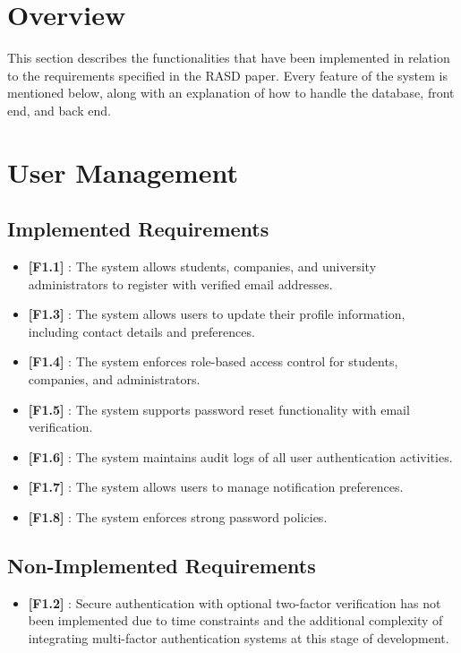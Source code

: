 \section{Overview}
\label{sec:overview}
This section describes the functionalities that have been implemented in relation to the requirements specified in the RASD paper. Every feature of the system is mentioned below, along with an explanation of how to handle the database, front end, and back end.

\section{User Management}
\subsection*{Implemented Requirements}
\begin{itemize}
    \item \textbf{[F1.1]} : The system allows students, companies, and university administrators to register with verified email addresses.
    \item \textbf{[F1.3]} : The system allows users to update their profile information, including contact details and preferences.
    \item \textbf{[F1.4]} : The system enforces role-based access control for students, companies, and administrators.
    \item \textbf{[F1.5]} : The system supports password reset functionality with email verification.
    \item \textbf{[F1.6]} : The system maintains audit logs of all user authentication activities.
    \item \textbf{[F1.7]} : The system allows users to manage notification preferences.
    \item \textbf{[F1.8]} : The system enforces strong password policies.
\end{itemize}

\subsection*{Non-Implemented Requirements}
\begin{itemize}
    \item \textbf{[F1.2]} : Secure authentication with optional two-factor verification has not been implemented due to time constraints and the additional complexity of integrating multi-factor authentication systems at this stage of development.
\end{itemize}

